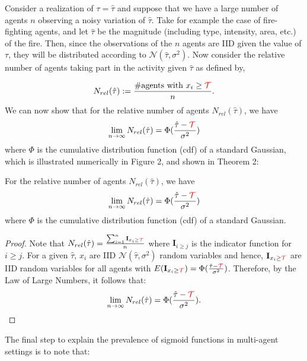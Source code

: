 \documentclass[smallextended]{svjour3}       %
\newcommand{\edit}[1]{\textcolor{red}{#1}}
\def\td{\edit{\mathcal{T}}}   %
\begin{document}
Consider a realization of $\tau=\hat{\tau}$ and suppose that we have a large number of agents $n$ observing a noisy variation of $\hat{\tau}$. Take for example the case of fire-fighting agents, and let $\hat{\tau}$ be the magnitude (including type, intensity, area, etc.) of the fire. Then, since the observations of the $n$ agents are IID given the value of $\tau$, they will be distributed according to $\mathcal{N}(\hat{\tau},\sigma^2)$. Now consider the relative number of agents taking part in the activity given $\hat{\tau}$ as defined by,

\begin{equation*}
	N_{rel}(\hat{\tau}):=\frac{\#\text{agents with }x_i\geq \td}{n}.
\end{equation*}
We can now show that for the relative number of agents $N_{rel}(\hat{\tau})$, we have
\begin{equation}
\lim_{n\to\infty}N_{rel}(\hat{\tau})=\Phi(\frac{\hat{\tau}-\td}{\sigma^2})
\end{equation}
where $\Phi$ is the cumulative distribution function (cdf) of a standard Gaussian, which is illustrated numerically in Figure 2, and shown in Theorem 2:  

\begin{theorem}\label{thrm:relativefrequency}
For the relative number of agents $N_{rel}(\hat{\tau})$, we have
\begin{equation}
\lim_{n\to\infty}N_{rel}(\hat{\tau})=\Phi(\frac{\hat{\tau}-\td}{\sigma^2})
\end{equation}
where $\Phi$ is the cumulative distribution function (cdf) of a standard Gaussian. 
\end{theorem}
\begin{proof}
Note that $N_{rel}(\hat{\tau})=\frac{\sum_{i=1}^n\mathbf{I}_{x_i\geq \td}}{n}$ where $\mathbf{I}_{i\geq j}$ is the indicator function for $i\geq j$. For a given $\hat{\tau}$, $x_i$ are IID $\mathcal{N}(\hat{\tau},\sigma^2)$ random variables and hence, $\mathbf{I}_{x_i\geq \td}$ are IID random variables for all agents with $E(\mathbf{I}_{x_i\geq \td})=\Phi(\frac{\hat{\tau}-\td}{\sigma^2})$. Therefore, by the Law of Large Numbers, it follows that:
\begin{align*}
\lim_{n\to\infty}N_{rel}(\hat{\tau})=\Phi(\frac{\hat{\tau}-\td}{\sigma^2}).
\end{align*}
\end{proof}

The final step to explain the prevalence of sigmoid functions in multi-agent settings is to note that:
\end{document}
